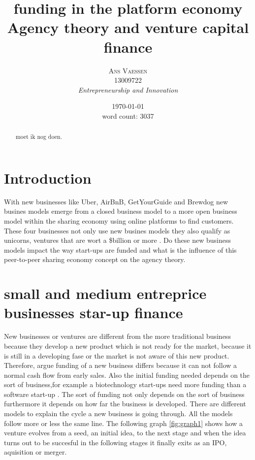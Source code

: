 \documentclass[a4paper, 11pt]{article}
\title{\textbf{funding in the platform economy}\\Agency theory and venture capital finance}
\author{\textsc{Ans Vaessen}
\\13009722
\\{\textit{Entrepreneurship and Innovation}}}
\date{\today\\
word count: 3037}
\begin{document}
\maketitle

\begin{abstract}
moet ik nog doen.
\end{abstract}



\vspace{30pt} %

\section*{Introduction}


With new businesses like Uber, AirBnB, GetYourGuide and Brewdog new busines models emerge from a closed business model to a more open business model within the sharing economy using online platforms to find customers. These four businesses not only use new busines models they also qualify as unicorns, ventures that are wort a \$billion or more \cite{TiddBessant}. Do these new business models impact the way start-ups are funded and what is the influence of this peer-to-peer sharing economy concept on the agency theory.

\section{small and medium entreprice businesses star-up finance}

New businesses or ventures are different from the more traditional business because they develop a new product which is not ready for the market, because it is still in a developing fase or the market is not aware of this new product. Therefore, \cite{TiddBessant} argue funding of a new business differs because it can not follow a normal cash flow from early sales. Also the initial funding needed depends on the sort of business,for example a biotechnology start-ups need more funding than a software start-up \citep{TiddBessant}. The sort of funding not only depends on the sort of business furthermore it depends on how far the business is developed. There are different models to explain the cycle a new business is going through. All the models follow more or less the same line. The following graph  \ref{fig:graph1} shows how a venture evolves from a seed, an initial idea, to the next stage and when the idea turns out to be succesful in the following stages it finally exits as an IPO, aquisition or merger.
\end{document}
